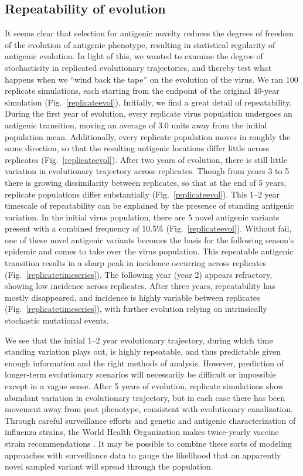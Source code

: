 \documentclass[11pt,oneside,letterpaper]{article}
\begin{document}
\subsection*{Repeatability of evolution}

It seems clear that selection for antigenic novelty reduces the degrees of freedom of the evolution of antigenic phenotype, resulting in statistical regularity of antigenic evolution.  In light of this, we wanted to examine the degree of stochasticity in replicated evolutionary trajectories, and thereby test what happens when we ``wind back the tape'' \cite{GouldWonderfulLife} on the evolution of the virus.  We ran 100 replicate simulations, each starting from the endpoint of the original 40-year simulation (Fig.~\ref{replicateevol}).  Initially, we find a great detail of repeatability.  During the first year of evolution, every replicate virus population undergoes an antigenic transition, moving an average of 3.0 units away from the initial population mean.  Additionally, every replicate population moves in roughly the same direction, so that the resulting antigenic locations differ little across replicates (Fig.~\ref{replicateevol}).  After two years of evolution, there is still little variation in evolutionary trajectory across replicates.  Though from years 3 to 5 there is growing dissimilarity between replicates, so that at the end of 5 years, replicate populations differ substantially (Fig.~\ref{replicateevol}).  This 1--2 year timescale of repeatability can be explained by the presence of standing antigenic variation.  In the initial virus population, there are 5 novel antigenic variants present with a combined frequency of 10.5\% (Fig.~\ref{replicateevol}).  Without fail, one of these novel antigenic variants becomes the basis for the following season's epidemic and comes to take over the virus population.  This repeatable antigenic transition results in a sharp peak in incidence occurring across replicates (Fig.~\ref{replicatetimeseries}).  The following year (year 2) appears refractory, showing low incidence across replicates.  After three years, repeatability has mostly disappeared, and incidence is highly variable between replicates (Fig.~\ref{replicatetimeseries}), with further evolution relying on intrinsically stochastic mutational events.

We see that the initial 1--2 year evolutionary trajectory, during which time standing variation plays out, is highly repeatable, and thus predictable given enough information and the right methods of analysis.  However, prediction of longer-term evolutionary scenarios will necessarily be difficult or impossible except in a vague sense.  After 5 years of evolution, replicate simulations show abundant variation in evolutionary trajectory, but in each case there has been movement away from past phenotype, consistent with evolutionary canalization.  Through careful surveillance efforts and genetic and antigenic characterization of influenza strains, the World Health Organization makes twice-yearly vaccine strain recommendations \cite{Barr10}.  It may be possible to combine these sorts of modeling approaches with surveillance data to gauge the likelihood that an apparently novel sampled variant will spread through the population.
\end{document}

